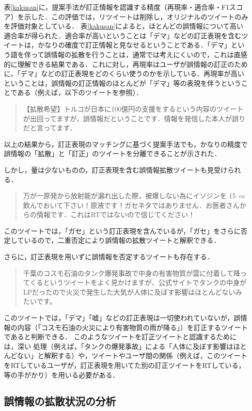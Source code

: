 \documentclass[japanese]{jnlp_1.4}
\begin{document}
表\ref{kakusan}に，提案手法が訂正情報を認識する精度（再現率・適合率・F1スコア）を示した．この評価では，リツイートは削除し，オリジナルのツイートのみを評価対象としている．
表\ref{kakusan}によると，ほとんどの誤情報について高い適合率が得られた．適合率が高いということは「デマ」などの訂正表現を含むツイートは，かなりの確度で訂正情報と見なせるということである．「デマ」という語を伴って誤情報の拡散を行うことは，通常では考えにくいので，これは直感的に理解できる結果である．これに対し，再現率はユーザが誤情報の訂正のために，「デマ」などの訂正表現をどのくらい使うのかを示している．再現率が高いということは，誤情報の訂正情報のほとんどが「デマ」等の表現を伴うということである（例えば，以下のツイートを参照）．
\begin{quote}
【拡散希望】トルコが日本に100億円の支援をするという内容のツイートが出回ってますが，誤情報だということです．情報を発信した本人が誤りだと言ってます．
\end{quote}
以上の結果から，訂正表現のマッチングに基づく提案手法でも，かなりの精度で誤情報の「拡散」と「訂正」のツイートを分離できることが示された．

しかし，量は少ないものの，訂正表現を含む誤情報拡散ツイートも見受けられる．
\begin{quote}
万が一原発から放射能が漏れ出した際，被爆しない為にイソジンを 15~cc 飲んでおいて下さい！原液です！ガセネタではありません．お医者さんからの情報です．これはRTではないので信じてください！
\end{quote}
このツイートでは，「ガセ」という訂正表現を含んでいるが，「ガセ」をさらに否定しているので，二重否定により誤情報の拡散ツイートと解釈できる．

さらに，訂正表現を用いずに誤情報を否定するツイートも存在する．
\begin{quote}
千葉のコスモ石油のタンク爆発事故で中身の有害物質が雲に付着して降ってくるというツイートをよく見かけますが、公式サイトでタンクの中身がLPだったので火災で発生した大気が人体に及ぼす影響はほとんどないみたいです。
\end{quote}
このツイートでは，「デマ」「嘘」などの訂正表現は一切使われていないが，誤情報の内容（「コスモ石油の火災により有害物質の雨が降る」）を訂正するツイートであると判断できる．
このようなツイートを訂正ツイートと認識するためには，深い
処理（例えば，「タンクの爆発事故」による「人体に及ぼす影響はほとんどない」と解釈する）や，ツイートやユーザ間の関係（例えば，このツイートをRTしているユーザが，訂正表現を用いてた別の訂正ツイートをRTしている，等の手がかり）を用いる必要がある．


\subsection{誤情報の拡散状況の分析}
\end{document}
